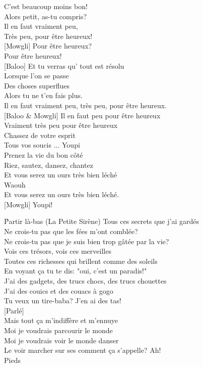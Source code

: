 \documentclass{novel}
\begin{document}
\begin{multicols}{2}
C'est beaucoup moins bon! \\
Alors petit, as-tu compris? \\
Il en faut vraiment peu, \\
Très peu, pour être heureux! \\
{[Mowgli]} Pour être heureux? \\
Pour être heureux! \\ 
{[Baloo]} Et tu verras qu' tout est résolu \\
Lorsque l'on se passe \\
Des choses superflues \\
Alors tu ne t'en fais plus. \\
Il en faut vraiment peu, très peu, pour être heureux. \\
{[Baloo \& Mowgli]} Il en faut peu pour être heureux \\
Vraiment très peu pour être heureux \\
Chassez de votre esprit \\
Tous vos soucis ... Youpi \\
Prenez la vie du bon côté \\
Riez, sautez, dansez, chantez \\
Et vous serez un ours très bien léché \\
Waouh \\
Et vous serez un ours très bien léché. \\
{[Mowgli]} Youpi!
\end{multicols}

\newpage
\normalsize
\h*{Partir là-bas (La Petite Sirène)}
Tous ces secrets que j'ai gardés \\
Ne crois-tu pas que les fées m'ont comblée? \\
Ne crois-tu pas que je suis bien trop gâtée par la vie? \\
Vois ces trésors, vois ces merveilles \\
Toutes ces richesses qui brillent comme des soleils \\
En voyant ça tu te dis: "oui, c'est un paradis!" \\
J'ai des gadgets, des trucs chocs, des trucs chouettes \\
J'ai des couics et des couacs à gogo \\
Tu veux un tire-baba? J'en ai des tas! \\

{[Parlé]} \\
Mais tout ça m'indiffère et m'ennuye \\
Moi je voudrais parcourir le monde \\
Moi je voudrais voir le monde danser \\
Le voir marcher sur ses comment ça s'appelle? Ah! \\
Pieds \\
\end{document}
